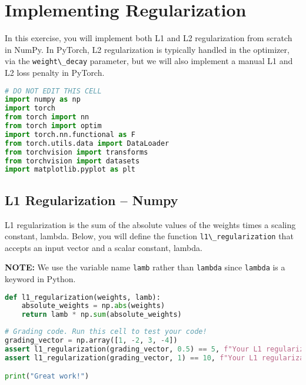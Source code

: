 \section{Implementing Regularization}\label{implementing-regularization}

In this exercise, you will implement both L1 and L2 regularization from
scratch in NumPy. In PyTorch, L2 regularization is typically handled in
the optimizer, via the \lstinline!weight\_decay!
parameter, but we will also implement a manual L1 and L2 loss penalty in
PyTorch.

\begin{lstlisting}[language=Python]
# DO NOT EDIT THIS CELL
import numpy as np
import torch
from torch import nn
from torch import optim
import torch.nn.functional as F
from torch.utils.data import DataLoader
from torchvision import transforms
from torchvision import datasets
import matplotlib.pyplot as plt
\end{lstlisting}

\subsection{L1 Regularization -- Numpy}\label{l1-regularization-numpy}

L1 regularization is the sum of the absolute values of the weights times
a scaling constant, lambda. Below, you will define the function
\lstinline!l1\_regularization! that accepts an input
vector and a scalar constant, lambda.

\textbf{NOTE:} We use the variable name \lstinline!lamb!
rather than \lstinline!lambda! since
\lstinline!lambda! is a keyword in Python.

\begin{lstlisting}[language=Python]
def l1_regularization(weights, lamb):
    absolute_weights = np.abs(weights)
    return lamb * np.sum(absolute_weights)
\end{lstlisting}

\begin{lstlisting}[language=Python]
# Grading code. Run this cell to test your code!
grading_vector = np.array([1, -2, 3, -4])
assert l1_regularization(grading_vector, 0.5) == 5, f"Your L1 regularization implementation seems to be incorrect. Expected 5, got {l1_regularization(grading_vector, 0.5)}"
assert l1_regularization(grading_vector, 1) == 10, f"Your L1 regularization implementation seems to be incorrect. Expected 10, got {l1_regularization(grading_vector, 1)}"

print("Great work!")
\end{lstlisting}

